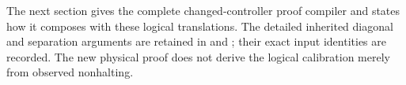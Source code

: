 The next section gives the complete changed-controller proof compiler and
states how it composes with these logical translations. The detailed
inherited diagonal and separation arguments are retained in
 and ; their exact
input identities are recorded. The new physical proof does not derive
the logical calibration merely from observed nonhalting.
